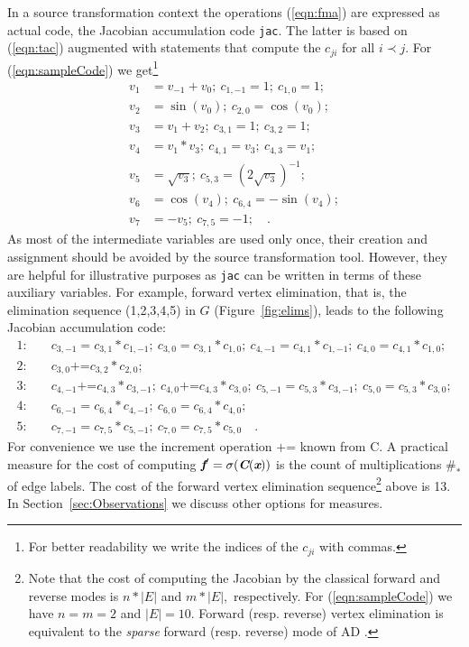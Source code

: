 \documentclass[acmtocl,acmnow]{acmtrans2m}
\newcommand{\bmC}{\mbox{\bf\em C}}
\newcommand{\bmf}{\mbox{\bf\em f}}
\newcommand{\bmx}{\mbox{\bf\em x}}
\newcommand{\reffig}[1]{Figure~\ref{#1}}
\newcommand{\refsec}[1]{Section~\ref{#1}}
\newcommand{\refeqn}[1]{(\ref{#1})}
\begin{document}
In a source transformation context the operations \refeqn{eqn:fma} are 
expressed as actual code, the Jacobian accumulation code {\tt jac}.
The latter is based on \refeqn{eqn:tac} augmented with statements 
that compute the $c_{ji}$ for all $i \prec j.$
For \refeqn{eqn:sampleCode} we get\footnote{
For better readability we write the indices of the $c_{ji}$ with commas.
} 
\begin{align*}
 v_1&=v_{-1}+v_0;~c_{1,-1}=1;~c_{1,0}=1; \\
 v_2&=\sin(v_0);~c_{2,0}=\cos(v_0); \\
 v_3&=v_1+v_2;~c_{3,1}=1;~c_{3,2}=1; \\
 v_4&=v_1*v_3;~c_{4,1}=v_3;~c_{4,3}=v_1; \\
 v_5&=\sqrt{v_3};~c_{5,3}=(2\sqrt{v_3})^{-1}; \\
 v_6&=\cos(v_4);~c_{6,4}=-\sin(v_4); \\
 v_7&=-v_5;~c_{7,5}=-1; \quad .
\end{align*}
As most of the intermediate variables are used only once, their
creation and assignment should be avoided by the source transformation tool.
However, they are helpful for illustrative purposes as {\tt jac} can
be written in terms of these auxiliary variables.
For example, forward vertex elimination, that is, the elimination
sequence (1,2,3,4,5) in $G$ (\reffig{fig:elims}), leads to the
following Jacobian accumulation code:
\begin{align*}
1:\quad  &c_{3,-1}=c_{3,1} * c_{1,-1};~c_{3,0}=c_{3,1} * c_{1,0};~c_{4,-1}=c_{4,1} * c_{1,-1};~c_{4,0}=c_{4,1} * c_{1,0}; \\
2:\quad  &c_{3,0}\mbox{+=}c_{3,2} * c_{2,0}; \\
3:\quad  &c_{4,-1}\mbox{+=}c_{4,3} * c_{3,-1};~c_{4,0}\mbox{+=}c_{4,3} * c_{3,0};~c_{5,-1}=c_{5,3} * c_{3,-1};~c_{5,0}=c_{5,3} * c_{3,0}; \\
4:\quad  &c_{6,-1}=c_{6,4} * c_{4,-1};~c_{6,0}=c_{6,4} * c_{4,0}; \\
5:\quad  &c_{7,-1}=c_{7,5} * c_{5,-1};~c_{7,0}=c_{7,5} * c_{5,0} \quad .
\end{align*}
\pagebreak
For convenience we use the increment operation $\mbox{+=}$ known from C.
A practical measure for the cost of computing 
$\bmf'=\sigma(\bmC(\bmx))$ is 
the count of multiplications $\#_*$ of edge labels. 
The cost of the forward vertex elimination sequence\footnote{Note
that the cost of computing the Jacobian by the classical forward and reverse 
modes is $n*|E|$ and $m*|E|,$ respectively. For \protect\refeqn{eqn:sampleCode} we have $n=m=2$ and
$|E|=10.$ Forward (resp. reverse) vertex elimination is equivalent to the 
{\em sparse} forward (resp. reverse) mode of AD \protect\cite{Gri00}.}
above is 13.
In \refsec{sec:Observations} we discuss other options for measures.
\end{document}
